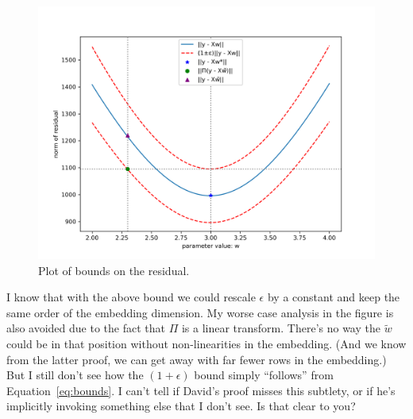 \begin{figure}
    \centering
    \includegraphics[width=15cm]{figures/residual_bound.png}
    \caption{Plot of bounds on the residual.}
\end{figure}
I know that with the above bound we could rescale $\epsilon$ by a constant
and keep the same order of the embedding dimension.
My worse case analysis in the figure is also avoided due to the 
fact that $\Pi$ is a linear transform. 
There's no way the $\tilde{w}$ could be in that position without non-linearities in the embedding.
(And we know from the latter proof, we can get away with far fewer rows in the embedding.)
But I still don't see how the $(1+\epsilon)$ bound 
simply ``follows'' from Equation~\ref{eq:bounds}.
I can't tell if David's proof misses this subtlety, 
or if he's implicitly invoking something else that I don't see. 
Is that clear to you?

% 
% 
% 